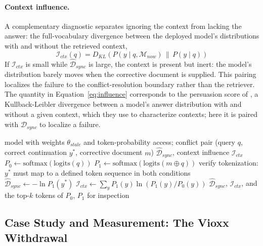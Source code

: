 \documentclass[manuscript, screen, review]{jair}
\begin{document}
\paragraph{Context influence.} A complementary diagnostic separates ignoring the context from lacking the answer: the full-vocabulary divergence between the deployed model's distributions with and without the retrieved context,
\begin{equation}
  \label{eq:influence}
  \mathcal{I}_{ctx}(q) = D_{KL}\!\left( P(y \mid q, \mathcal{M}_{now}) \,\|\, P(y \mid q) \right)
\end{equation}
If $\mathcal{I}_{ctx}$ is small while $\widehat{\mathcal{D}}_{sync}$ is large, the context is present but inert: the model's distribution barely moves when the corrective document is supplied. This pairing localizes the failure to the conflict-resolution boundary rather than the retriever. The quantity in Equation~\ref{eq:influence} corresponds to the persuasion score of \citet{du2024context}, a Kullback-Leibler divergence between a model's answer distribution with and without a given context, which they use to characterize contexts; here it is paired with $\widehat{\mathcal{D}}_{sync}$ to localize a failure.

\begin{algorithm}[t]
\caption{$\mathcal{D}_{sync}$ measurement protocol}
\label{alg:dsync}
\begin{algorithmic}[1]
\Require model with weights $\theta_{stale}$ and token-probability access; conflict pair (query $q$, correct continuation $y^*$, corrective document $m$)
\Ensure $\widehat{\mathcal{D}}_{sync}$, context influence $\mathcal{I}_{ctx}$
\State $P_0 \gets \text{softmax}\left(\text{logits}(q)\right)$ 
\State $P_1 \gets \text{softmax}\left(\text{logits}(m \oplus q)\right)$ 
\State verify tokenization: $y^*$ must map to a defined token sequence in both conditions
\State $\widehat{\mathcal{D}}_{sync} \gets -\ln P_1(y^*)$ 
\State $\mathcal{I}_{ctx} \gets \sum_{y} P_1(y) \ln \left( P_1(y) / P_0(y) \right)$ 
\State \Return $\widehat{\mathcal{D}}_{sync}$, $\mathcal{I}_{ctx}$, and the top-$k$ tokens of $P_0$, $P_1$ for inspection
\end{algorithmic}
\end{algorithm}

\subsection{Case Study and Measurement: The Vioxx Withdrawal}
\label{sec:case_study}
\end{document}
